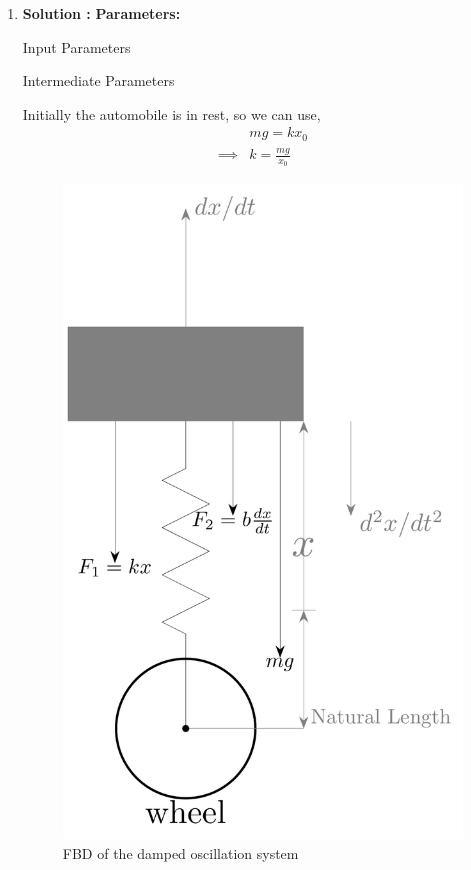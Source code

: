 \documentclass[journal,12pt,twocolumn]{IEEEtran}
\theoremstyle{remark}
\begin{document}
\begin{enumerate}
    \item \textbf{Solution :}
    \textbf{Parameters:}
    \begin{table}[htbp]
        \centering
        
        \vspace{5pt}
        \caption{Input Parameters}
        \label{tab:Table 1}
    \end{table}
    \begin{table}[htbp]
        \centering
        
        \vspace{5pt}
        \caption{Intermediate Parameters}
        \label{tab:Table 2}
    \end{table}
    
    \vspace{15pt}
    


    Initially the automobile is in rest, so we can use,
    \begin{align}
        &mg = kx_0 \label{eq:1}\\
        \implies &k=\frac{mg}{x_0} \label{eq:2}
    \end{align}

    \begin{figure}[h]
        \centering
        \includegraphics[width=0.8\columnwidth]{11_14_21_fbd.pdf}
        \caption{FBD of the damped oscillation system}
        \label{fig:Fig-1}
    \end{figure}


\end{enumerate}
\end{document}
